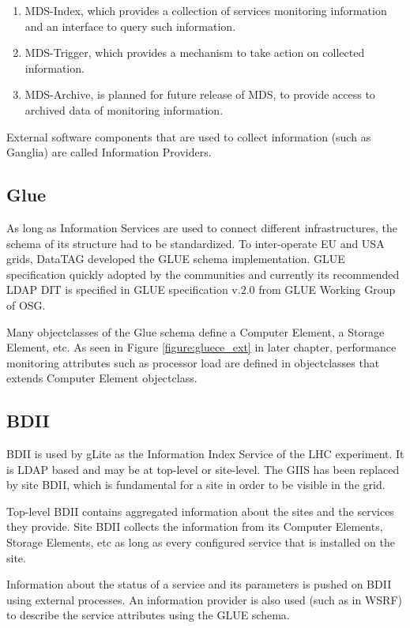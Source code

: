 \begin{enumerate}
  \item MDS-Index, which provides a collection of services monitoring information and an interface to query such information.
  \item MDS-Trigger, which provides a mechanism to take action on collected information.
  \item MDS-Archive, is planned for future release of MDS, to provide access to archived data of monitoring information.
\end{enumerate}

External software components that are used to collect information (such as Ganglia)\cite{gangliaWSRF} are called Information Providers.


\subsection{Glue}
As long as Information Services are used to connect different infrastructures, the schema of its structure had to be standardized. To inter-operate EU and USA grids, DataTAG developed the GLUE schema implementation. GLUE specification quickly adopted by the communities and currently its recommended LDAP DIT is specified in GLUE specification v.$2.0$ from GLUE Working Group of OSG.

Many objectclasses of the Glue schema define a Computer Element, a Storage Element, etc. As seen in Figure \ref{figure:gluece_ext} in later chapter, performance monitoring attributes such as processor load are defined in objectclasses that extends Computer Element objectclass.

\subsection{BDII}\label{subsec:BDII}
BDII is used by gLite as the Information Index Service of the LHC experiment. It is LDAP based and may be at top-level or site-level. The GIIS has been replaced by site BDII, which is fundamental for a site in order to be visible in the grid.

Top-level BDII contains aggregated information about the sites and the services they provide. Site BDII collects the information from its Computer Elements, Storage Elements, etc as long as every configured service that is installed on the site.

Information about the status of a service and its parameters is pushed on BDII using external processes. An information provider is also used (such as in WSRF) to describe the service attributes using the GLUE schema.

